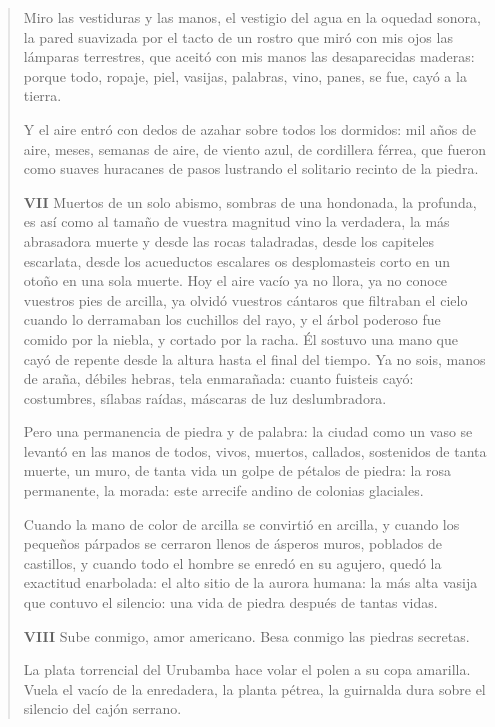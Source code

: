 \documentclass[12pt]{article}
\begin{document}
\begin{verse}
Miro las vestiduras y las manos,  
el vestigio del agua en la oquedad sonora,  
la pared suavizada por el tacto de un rostro  
que miró con mis ojos las lámparas terrestres,  
que aceitó con mis manos las desaparecidas  
maderas: porque todo, ropaje, piel, vasijas,  
palabras, vino, panes,  
se fue, cayó a la tierra.  
	
Y el aire entró con dedos  
de azahar sobre todos los dormidos:  
mil años de aire, meses, semanas de aire,  
de viento azul, de cordillera férrea,  
que fueron como suaves huracanes de pasos  
lustrando el solitario recinto de la piedra.  

\vspace{\baselineskip}
{\scshape\bfseries VII}
Muertos de un solo abismo, sombras de una hondonada,  
la profunda, es así como al tamaño  
de vuestra magnitud  
vino la verdadera, la más abrasadora  
muerte y desde las rocas taladradas,  
desde los capiteles escarlata,  
desde los acueductos escalares  
os desplomasteis corto en un otoño  
en una sola muerte.  
Hoy el aire vacío ya no llora,  
ya no conoce vuestros pies de arcilla,  
ya olvidó vuestros cántaros que filtraban el cielo  
cuando lo derramaban los cuchillos del rayo,  
y el árbol poderoso fue comido  
por la niebla, y cortado por la racha.  
Él sostuvo una mano que cayó de repente  
desde la altura hasta el final del tiempo.  
Ya no sois, manos de araña, débiles  
hebras, tela enmarañada:  
cuanto fuisteis cayó: costumbres, sílabas  
raídas, máscaras de luz deslumbradora.  
	
Pero una permanencia de piedra y de palabra:  
la ciudad como un vaso se levantó en las manos  
de todos, vivos, muertos, callados, sostenidos  
de tanta muerte, un muro, de tanta vida un golpe  
de pétalos de piedra: la rosa permanente, la morada:  
este arrecife andino de colonias glaciales.  
	
Cuando la mano de color de arcilla  
se convirtió en arcilla, y cuando los pequeños párpados se cerraron  
llenos de ásperos muros, poblados de castillos,  
y cuando todo el hombre se enredó en su agujero,  
quedó la exactitud enarbolada:  
el alto sitio de la aurora humana:  
la más alta vasija que contuvo el silencio:  
una vida de piedra después de tantas vidas.  

\vspace{\baselineskip}
{\scshape\bfseries VIII}
Sube conmigo, amor americano.  
Besa conmigo las piedras secretas.  
	
La plata torrencial del Urubamba  
hace volar el polen a su copa amarilla.  
Vuela el vacío de la enredadera,  
la planta pétrea, la guirnalda dura  
sobre el silencio del cajón serrano.  
	

\end{verse}
\end{document}
